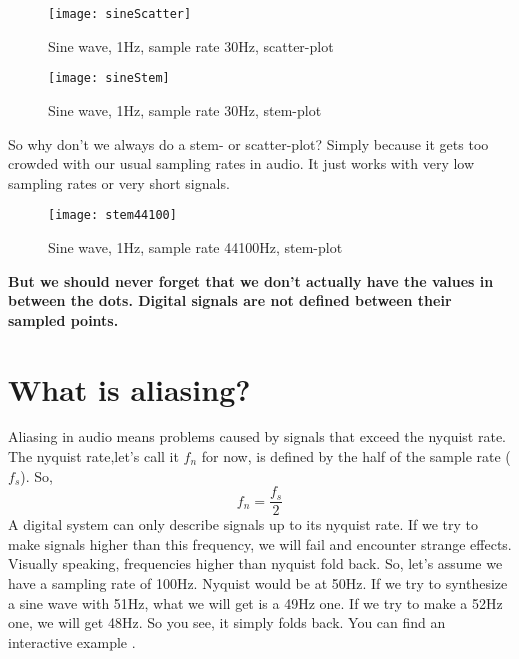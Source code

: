 \begin{figure}[H]
	\centering
	\texttt{[image: sineScatter]}
	\caption[Sine scatter-plot]
	{Sine wave, 1Hz, sample rate 30Hz, scatter-plot}
	\label{fig:scatter}
\end{figure}



\begin{figure}[H]
	\centering
	\texttt{[image: sineStem]}
	\caption[sine stem plot]
	{Sine wave, 1Hz, sample rate 30Hz, stem-plot}
	\label{fig:stem}
\end{figure}


So why don't we always do a stem- or scatter-plot? Simply because it gets too crowded with our usual sampling rates in audio. It just works with very low sampling rates or very short signals.\\
\begin{figure}[H]
	\centering
	\texttt{[image: stem44100]}
	\caption[sine stem plot, crowded]
	{Sine wave, 1Hz, sample rate 44100Hz, stem-plot}
	\label{fig:label}
\end{figure}
\textbf{But we should never forget that we don't actually have the values in between the dots. Digital signals are not defined between their sampled points.}

\section{What is aliasing?}
Aliasing in audio means problems caused by signals that exceed the nyquist rate.\\
The nyquist rate,let's call it $f_n$ for now, is defined by the half of the sample rate ($f_s$). So,
\begin{equation}
	f_n=\frac{f_s}{2}
\end{equation}
A digital system can only describe signals up to its nyquist rate. If we try to make signals higher than this frequency, we will fail and encounter strange effects.\\
Visually speaking, frequencies higher than nyquist fold back. So, let's assume we have a sampling rate of 100Hz. Nyquist would be at 50Hz. If we try to synthesize a sine wave with 51Hz, what we will get is a 49Hz one. If we try to make a 52Hz one, we will get 48Hz. So you see, it simply folds back. You can find an interactive example .

